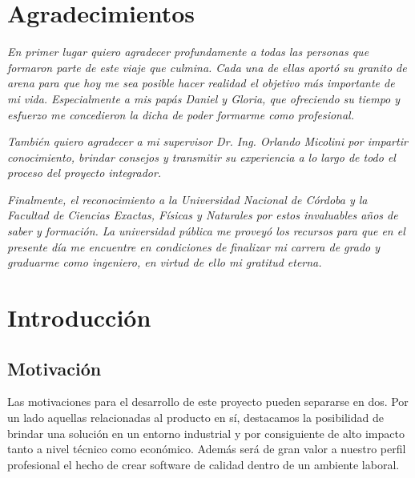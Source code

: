 \documentclass[a4paper,12pt]{article}
\begin{document}
\newpage
\thispagestyle{empty}
\section*{Agradecimientos}
\vspace*{\fill}

\begin{flushright}
	\textit{En primer lugar quiero agradecer profundamente a todas las personas que formaron parte de este viaje que culmina. Cada una de ellas aportó su granito de arena para que hoy me sea posible hacer realidad el objetivo más importante de mi vida. Especialmente a mis papás Daniel y Gloria, que ofreciendo su tiempo y esfuerzo me concedieron la dicha de poder formarme como profesional.}
\end{flushright}

\begin{flushright}
	\textit{También quiero agradecer a mi supervisor Dr. Ing. Orlando Micolini por impartir conocimiento, brindar consejos y transmitir su experiencia a lo largo de todo el proceso del proyecto integrador.}
\end{flushright}

\begin{flushright}
	\textit{Finalmente, el reconocimiento a la Universidad Nacional de Córdoba y la Facultad de Ciencias Exactas, Físicas y Naturales por estos invaluables años de saber y formación. La universidad pública me proveyó los recursos para que en el presente día me encuentre en condiciones de finalizar mi carrera de grado y graduarme como ingeniero, en virtud de ello mi gratitud eterna.}
\end{flushright}

\vspace*{\fill}

\clearpage

\tableofcontents

\clearpage

\section{Introducción}

\subsection{Motivación}
Las motivaciones para el desarrollo de este proyecto pueden separarse en dos. Por un lado aquellas relacionadas al producto en sí, destacamos la posibilidad de brindar una solución en un entorno industrial y por consiguiente de alto impacto tanto a nivel técnico como económico. Además será de gran valor a nuestro perfil profesional el hecho de crear software de calidad dentro de un ambiente laboral.
\end{document}
